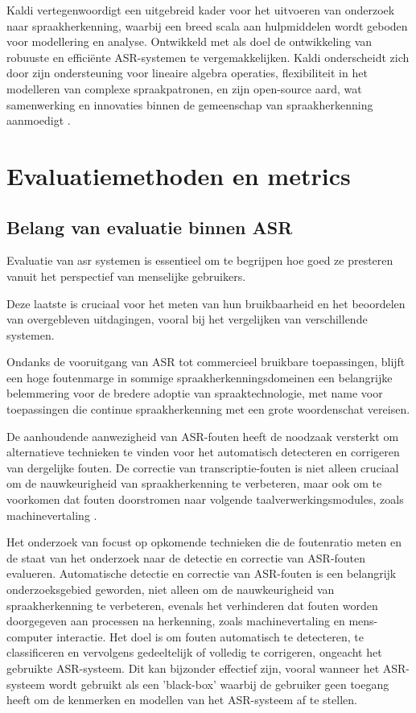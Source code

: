 Kaldi vertegenwoordigt een uitgebreid kader voor het uitvoeren van onderzoek naar spraakherkenning, waarbij een breed scala aan hulpmiddelen wordt geboden voor modellering en analyse. Ontwikkeld met als doel de ontwikkeling van robuuste en efficiënte ASR-systemen te vergemakkelijken. Kaldi onderscheidt zich door zijn ondersteuning voor lineaire algebra operaties, flexibiliteit in het modelleren van complexe spraakpatronen, en zijn open-source aard, wat samenwerking en innovaties binnen de gemeenschap van spraakherkenning aanmoedigt \autocite{Povey_ASRU2011}.


\section{Evaluatiemethoden en metrics}
\subsection{Belang van evaluatie binnen ASR}
Evaluatie van \gls{asr} systemen is essentieel 
om te begrijpen hoe goed ze presteren vanuit het perspectief van menselijke gebruikers.

 Deze laatste is cruciaal voor het meten van hun bruikbaarheid en het beoordelen van overgebleven uitdagingen, vooral bij het vergelijken van verschillende systemen. 

Ondanks de vooruitgang van ASR tot commercieel bruikbare toepassingen, blijft een hoge foutenmarge in sommige spraakherkenningsdomeinen een belangrijke belemmering voor de bredere adoptie van spraaktechnologie, met name voor toepassingen die continue spraakherkenning met een grote woordenschat vereisen.

De aanhoudende aanwezigheid van ASR-fouten heeft de noodzaak versterkt om alternatieve technieken te vinden voor het automatisch detecteren en corrigeren van dergelijke fouten. De correctie van transcriptie-fouten is niet alleen cruciaal om de nauwkeurigheid van spraakherkenning te verbeteren, maar ook om te voorkomen dat fouten doorstromen naar volgende taalverwerkingsmodules, zoals machinevertaling \autocite{Errattahi_2018}.

Het onderzoek van \textcite{Errattahi_2018} focust op opkomende technieken die de foutenratio meten en de staat van het onderzoek naar de detectie en correctie van ASR-fouten evalueren. Automatische detectie en correctie van ASR-fouten is een belangrijk onderzoeksgebied geworden, niet alleen om de nauwkeurigheid van spraakherkenning te verbeteren, evenals het verhinderen dat fouten worden doorgegeven aan processen na herkenning, zoals machinevertaling en mens-computer interactie. Het doel is om fouten automatisch te detecteren, te classificeren en vervolgens gedeeltelijk of volledig te corrigeren, ongeacht het gebruikte ASR-systeem. Dit kan bijzonder effectief zijn, vooral wanneer het ASR-systeem wordt gebruikt als een 'black-box' waarbij de gebruiker geen toegang heeft om de kenmerken en modellen van het ASR-systeem af te stellen.

